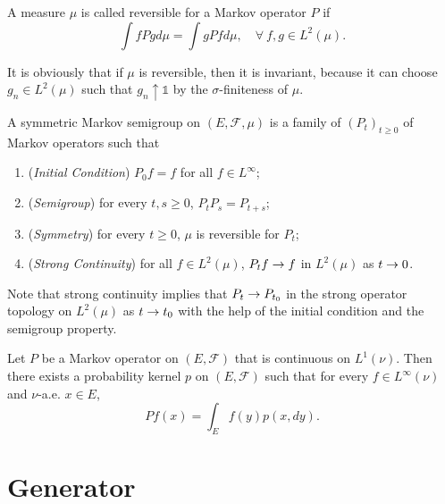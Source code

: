 \begin{defn}
    A measure $\mu$ is called reversible for a Markov operator $P$ if 
    \begin{equation*}
        \int f P g d \mu=\int g P f d \mu,\quad \forall~f,g \in L^2(\mu).
    \end{equation*}
\end{defn}
\begin{rmk}
    It is obviously that if $\mu$ is reversible, then it is invariant, because it can choose $g_n \in L^2(\mu)$ such that $g_n \uparrow \mathds{1}$ by the $\sigma$-finiteness of $\mu$.
\end{rmk}

\begin{defn}
    A symmetric Markov semigroup on $(E, \mathcal{F},\mu)$ is a family of $(P_t)_{t \geq 0}$ of Markov operators such that
    \begin{enumerate}[label=(\roman*)]
    	\item (\emph{Initial Condition}) $P_0f = f$ for all $f \in L^\infty$;
    	\item (\emph{Semigroup}) for every $t,s \geq 0$, $P_tP_s = P_{t+s}$;
    	\item (\emph{Symmetry}) for every $t \geq 0$, $\mu$ is reversible for $P_t$;
    	\item (\emph{Strong Continuity}) for all $f \in L^2(\mu)$, $P_t f \rightarrow f$ in $L^2(\mu)$ as $t \rightarrow 0$.
    \end{enumerate}
\end{defn}
\begin{rmk}
    Note that strong continuity implies that $P_t \rightarrow P_{t_0}$ in the strong operator topology on $L^2(\mu)$ as $t \rightarrow t_0$ with the help of the initial condition and the semigroup property.
\end{rmk}

\begin{thm}
    Let $P$ be a Markov operator on $(E,\mathcal{F})$ that is continuous on $L^1(\nu)$. Then there exists a probability kernel $p$ on $(E, \mathcal{F})$ such that for every $f \in L^\infty(\nu)$ and $\nu$-a.e. $x \in E$,
    \begin{equation*}
    	Pf(x) = \int_E f(y) p(x,dy).
    \end{equation*}
\end{thm}

\section{Generator}

